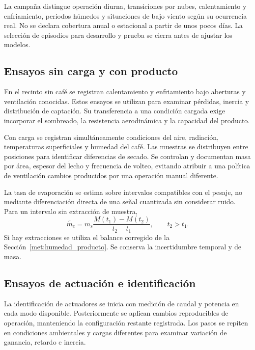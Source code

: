 La campaña distingue operación diurna, transiciones por nubes, calentamiento y enfriamiento, períodos húmedos y situaciones de bajo viento según su ocurrencia real. No se declara cobertura anual o estacional a partir de unos pocos días. La selección de episodios para desarrollo y prueba se cierra antes de ajustar los modelos.

\subsection{Ensayos sin carga y con producto}

En el recinto sin café se registran calentamiento y enfriamiento bajo aberturas y ventilación conocidas. Estos ensayos se utilizan para examinar pérdidas, inercia y distribución de captación. Su transferencia a una condición cargada exige incorporar el sombreado, la resistencia aerodinámica y la capacidad del producto.

Con carga se registran simultáneamente condiciones del aire, radiación, temperaturas superficiales y humedad del café. Las muestras se distribuyen entre posiciones para identificar diferencias de secado. Se controlan y documentan masa por área, espesor del lecho y frecuencia de volteo, evitando atribuir a una política de ventilación cambios producidos por una operación manual diferente.

La tasa de evaporación se estima sobre intervalos compatibles con el pesaje, no mediante diferenciación directa de una señal cuantizada sin considerar ruido. Para un intervalo sin extracción de muestra,
\begin{equation}
\overline{\dot m}_e=
m_s\frac{M(t_1)-M(t_2)}{t_2-t_1},
\qquad t_2>t_1.
\label{met:evaporacion_intervalo}
\end{equation}
Si hay extracciones se utiliza el balance corregido de la Sección~\ref{met:humedad_producto}. Se conserva la incertidumbre temporal y de masa.

\subsection{Ensayos de actuación e identificación}

La identificación de actuadores se inicia con medición de caudal y potencia en cada modo disponible. Posteriormente se aplican cambios reproducibles de operación, manteniendo la configuración restante registrada. Los pasos se repiten en condiciones ambientales y cargas diferentes para examinar variación de ganancia, retardo e inercia.

